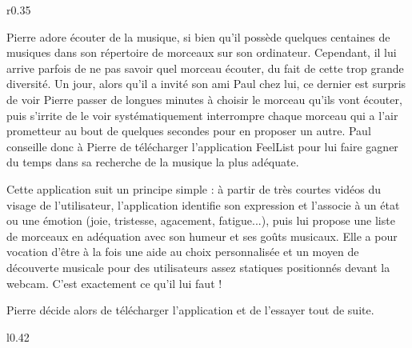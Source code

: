 \setlength{\fboxsep}{3.4mm}

\begin{wrapfigure}{r}{0.35\textwidth}
\end{wrapfigure}

Pierre adore écouter de la musique, si bien qu’il possède quelques centaines de musiques dans son répertoire de morceaux sur son ordinateur.
Cependant, il lui arrive parfois de ne pas savoir quel morceau écouter, du fait de cette trop grande diversité.
Un jour, alors qu’il a invité son ami Paul chez lui, ce dernier est surpris de voir Pierre passer de longues minutes à choisir le morceau qu’ils vont écouter, puis s'irrite de le voir systématiquement interrompre chaque morceau qui a l'air prometteur au bout de quelques secondes pour en proposer un autre.
Paul conseille donc à Pierre de télécharger l’application FeelList pour lui faire gagner du temps dans sa recherche de la musique la plus adéquate.

Cette application suit un principe simple : à partir de très courtes vidéos du visage de l’utilisateur, l'application identifie son expression et l'associe à un état ou une émotion (joie, tristesse, agacement, fatigue...), puis lui propose une liste de morceaux en adéquation avec son humeur et ses goûts musicaux.
Elle a pour vocation d'être à la fois une aide au choix personnalisée et un moyen de découverte musicale pour des utilisateurs assez statiques positionnés devant la webcam.
C'est exactement ce qu'il lui faut !

Pierre décide alors de télécharger l’application et de l’essayer tout de suite.\\

\begin{wrapfigure}{l}{0.42\textwidth}
\end{wrapfigure}

